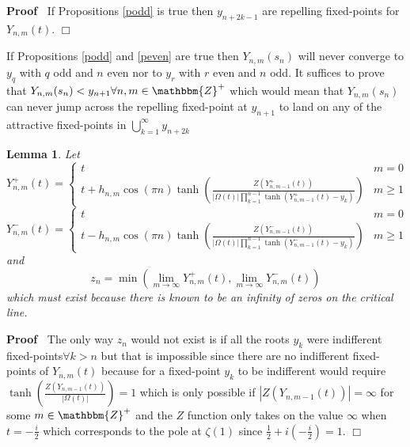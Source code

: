 \documentclass{article}
\newenvironment{proof}{\noindent\textbf{Proof\ }}{\hspace*{\fill}$\Box$\medskip}
\newtheorem{lemma}{Lemma}
{\theorembodyfont{\rmfamily}\newtheorem{note}{Note}}
\begin{document}
\begin{proof}
  If Propositions \ref{podd} is true then $y_{n + 2 k - 1}$ are repelling
  fixed-points for $Y_{n, m} (t)$.
\end{proof}

\begin{note}
  If Propositions \ref{podd} and \ref{peven} are true then $Y_{n, m} (s_n)$
  will never converge to $y_q$ with $q$ odd and $n$ even nor to $y_r$ with $r$
  even and $n$ odd. It suffices to prove that $Y_{n, m} (s_n) < y_{n + 1}
  \forall n, m \in \mathbbm{Z}^+$ which would mean that $Y_{n, m} (s_n)$ can
  never jump across the repelling fixed-point at $y_{n + 1}$ to land on any of
  the attractive fixed-points in $\bigcup_{k = 1}^{\infty} y_{n + 2 k}$
\end{note}

\begin{lemma}
  Let
  \begin{equation}
    Y^+_{n, m} (t) = \left\{ \begin{array}{ll}
      t & m = 0\\
      t + h_{n, m} \cos (\pi n) \tanh \left( \frac{Z (Y^+_{n, m - 1} (t))}{|
      \Omega (t) | \prod_{k = 1}^{n - 1} \tanh (Y^+_{n, m - 1} (t) - y_k)}
      \right) & m \geqslant 1
    \end{array} \right.
  \end{equation}
  \begin{equation}
    Y^-_{n, m} (t) = \left\{ \begin{array}{ll}
      t & m = 0\\
      t - h_{n, m} \cos (\pi n) \tanh \left( \frac{Z (Y^-_{n, m - 1} (t))}{|
      \Omega (t) | \prod_{k = 1}^{n - 1} \tanh (Y^-_{n, m - 1} (t) - y_k)}
      \right) & m \geqslant 1
    \end{array} \right.
  \end{equation}
  and
  \begin{equation}
    z_n = \min (\lim_{m \rightarrow \infty} Y^+_{n, m} (t), \lim_{m
    \rightarrow \infty} Y^-_{n, m} (t))
  \end{equation}
  which must exist because there is known to be an infinity of zeros on the
  critical line. 
\end{lemma}

\begin{proof}
  The only way $z_n$ would not exist is if all the roots $y_k$ were
  indifferent fixed-points$\forall k > n$ but that is impossible since there
  are no indifferent fixed-points of $Y_{n, m} (t)$ because for a fixed-point
  $y_k$ to be indifferent would require $\tanh \left( \frac{Z (Y_{n, m - 1}
  (t))}{| \Omega (t) |} \right) = 1$ which is only possible if $| Z (Y_{n, m -
  1} (t)) | = \infty$ for some $m \in \mathbbm{Z}^+$ and the $Z$ function only
  takes on the value $\infty$ when $t = - \frac{i}{2}$ which corresponds to
  the pole at $\zeta (1)$ since $\frac{1}{2} + i \left( - \frac{i}{2} \right)
  = 1$.
\end{proof}
\end{document}

